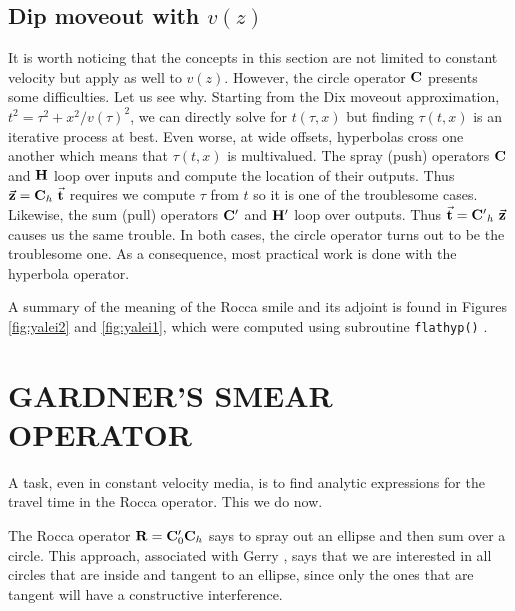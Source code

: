 \subsection{Dip moveout with $v(z)$}
It is worth noticing that the concepts in this section
are not limited to constant velocity
but apply as well to $v(z)$.
However,
the circle operator $\bold C$ presents some difficulties.
Let us see why.
Starting from the Dix moveout approximation,
$t^2 = \tau^2 + x^2/v(\tau )^2$,
we can directly solve for $t(\tau ,x)$
but finding $\tau (t,x)$ is an iterative process at best.
Even worse, at wide offsets, hyperbolas cross one another
which means that $\tau (t,x)$ is multivalued.
The spray (push)
operators $\bold C$ and $\bold H$ loop over inputs
and compute the location of their outputs.
Thus
$ \vec {\bold z} = \bold C_h\ \vec {\bold t}$
requires we compute $\tau$ from $t$ so it is
one of the troublesome cases.
Likewise, the sum (pull)
operators $\bold C'$ and $\bold H'$ loop over outputs.
Thus
$ \vec {\bold t} = {\bold C'}_h\ \vec {\bold z}$
causes us the same trouble.
In both cases, the circle operator
turns out to be the troublesome one.
As a consequence, most practical work is done with
the hyperbola operator.
\par
A summary of the meaning of the Rocca smile
and its adjoint is found in Figures
\ref{fig:yalei2} and \ref{fig:yalei1},
which were computed using subroutine
\texttt{flathyp()} .

\newslide

\newslide


\section{GARDNER'S SMEAR OPERATOR}
A task, even in constant velocity media,
is to find analytic expressions for the travel time
in the Rocca operator.
This we do now.

\par
The Rocca operator $ \bold R = \bold C'_0 \bold C_h$
says to spray out an ellipse and then sum over a circle.
This approach,
associated with Gerry ,
says that we are interested in all circles
that are inside and tangent to an ellipse,
since only the ones that are tangent
will have a constructive interference.

